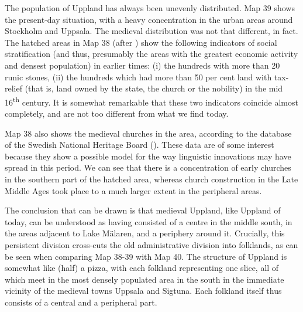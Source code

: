 
The population of Uppland has always been unevenly distributed. Map 39 shows the present-day situation, with a heavy concentration in the urban areas around Stockholm and Uppsala. The medieval distribution was not that different, in fact. The hatched areas in Map 38 (after \citet{Broberg1990}) show the following indicators of social stratification (and thus, presumably the areas with the greatest economic activity and densest population) in earlier times: (i) the hundreds with more than 20 runic stones, (ii) the hundreds which had more than 50 per cent land with tax-relief (that is, land owned by the state, the church or the nobility) in the mid 16\textsuperscript{th} century. It is somewhat remarkable that these two indicators coincide almost completely, and are not too different from what we find today. 


Map 38 also shows the medieval churches in the area, according to the database of the Swedish National Heritage Board (\href{http://www.raa.se}{}). These data are of some interest because they show a possible model for the way linguistic innovations may have spread in this period. We can see that there is a concentration of early churches in the southern part of the hatched area, whereas church construction in the Late Middle Ages took place to a much larger extent in the peripheral areas.


The conclusion that can be drawn is that medieval Uppland, like Uppland of today, can be understood as having consisted of a centre in the middle south, in the areas adjacent to Lake Mälaren, and a periphery around it. Crucially, this persistent division cross-cuts the old administrative division into folklands, as can be seen when comparing Map 38-39 with Map 40. The structure of Uppland is somewhat like (half) a pizza, with each folkland representing one slice, all of which meet in the most densely populated area in the south in the immediate vicinity of the medieval towns Uppsala and Sigtuna. Each folkland itself thus consists of a central and a peripheral part. 

